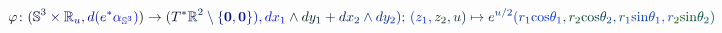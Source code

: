 \documentclass[12pt]{article}
\begin{document}
\makeatletter
\renewcommand*{\@textcolor}[3]{%
  \protect\leavevmode
  \begingroup
    \color#1{#2}#3%
  \endgroup
}
\makeatother
\begin{displaymath}
\mathcolor[RGB]{0,0,15}{\varphi} \mathcolor[RGB]{0,0,30}{\colon} \mathcolor[RGB]{0,0,45}{(} \mathbb { \mathcolor[RGB]{0,0,60}{S} } ^ { \mathcolor[RGB]{0,0,75}{3} } \mathcolor[RGB]{0,0,90}{\times} \mathbb { \mathcolor[RGB]{0,0,105}{R} } _ { \mathcolor[RGB]{0,0,120}{u} } \mathcolor[RGB]{0,0,135}{,} \mathcolor[RGB]{0,0,150}{d} \mathcolor[RGB]{0,0,165}{(} \mathcolor[RGB]{0,0,180}{e} ^ { \mathcolor[RGB]{0,0,195}{*} } \mathcolor[RGB]{0,0,210}{\alpha} _ { \mathbb { \mathcolor[RGB]{0,0,225}{S} } ^ { \mathcolor[RGB]{0,0,240}{3} } } \mathcolor[RGB]{0,0,255}{)} \mathcolor[RGB]{0,15,0}{)} \mathcolor[RGB]{0,15,15}{\to} \mathcolor[RGB]{0,15,30}{(} \mathcolor[RGB]{0,15,45}{T} ^ { \mathcolor[RGB]{0,15,60}{*} } \mathbb { \mathcolor[RGB]{0,15,75}{R} } ^ { \mathcolor[RGB]{0,15,90}{2} } \mathcolor[RGB]{0,15,105}{\setminus} \mathcolor[RGB]{0,15,120}{\{} \boldsymbol { \mathcolor[RGB]{0,15,135}{0} } \mathcolor[RGB]{0,15,150}{,} \boldsymbol { \mathcolor[RGB]{0,15,165}{0} } \mathcolor[RGB]{0,15,180}{\}} \mathcolor[RGB]{0,15,195}{)} \mathcolor[RGB]{0,15,210}{,} \mathcolor[RGB]{0,15,225}{d} \mathcolor[RGB]{0,15,240}{x} _ { \mathcolor[RGB]{0,15,255}{1} } \mathcolor[RGB]{0,30,0}{\wedge} \mathcolor[RGB]{0,30,15}{d} \mathcolor[RGB]{0,30,30}{y} _ { \mathcolor[RGB]{0,30,45}{1} } \mathcolor[RGB]{0,30,60}{+} \mathcolor[RGB]{0,30,75}{d} \mathcolor[RGB]{0,30,90}{x} _ { \mathcolor[RGB]{0,30,105}{2} } \mathcolor[RGB]{0,30,120}{\wedge} \mathcolor[RGB]{0,30,135}{d} \mathcolor[RGB]{0,30,150}{y} _ { \mathcolor[RGB]{0,30,165}{2} } \mathcolor[RGB]{0,30,180}{)} \mathcolor[RGB]{0,30,195}{;} \, \mathcolor[RGB]{0,30,210}{(} \mathcolor[RGB]{0,30,225}{z} _ { \mathcolor[RGB]{0,30,240}{1} } \mathcolor[RGB]{0,30,255}{,} \mathcolor[RGB]{0,45,0}{z} _ { \mathcolor[RGB]{0,45,15}{2} } \mathcolor[RGB]{0,45,30}{,} \mathcolor[RGB]{0,45,45}{u} \mathcolor[RGB]{0,45,60}{)} \mathcolor[RGB]{0,45,75}{\mapsto} \mathcolor[RGB]{0,45,90}{e} ^ { \mathcolor[RGB]{0,45,105}{u} \mathcolor[RGB]{0,45,120}{/} \mathcolor[RGB]{0,45,135}{2} } \mathcolor[RGB]{0,45,150}{(} \mathcolor[RGB]{0,45,165}{r} _ { \mathcolor[RGB]{0,45,180}{1} } \mathrm { \mathcolor[RGB]{0,45,195}{c} \mathcolor[RGB]{0,45,210}{o} \mathcolor[RGB]{0,45,225}{s} } \mathcolor[RGB]{0,45,240}{\theta} _ { \mathcolor[RGB]{0,45,255}{1} } \mathcolor[RGB]{0,60,0}{,} \mathcolor[RGB]{0,60,15}{r} _ { \mathcolor[RGB]{0,60,30}{2} } \mathrm { \mathcolor[RGB]{0,60,45}{c} \mathcolor[RGB]{0,60,60}{o} \mathcolor[RGB]{0,60,75}{s} } \mathcolor[RGB]{0,60,90}{\theta} _ { \mathcolor[RGB]{0,60,105}{2} } \mathcolor[RGB]{0,60,120}{,} \mathcolor[RGB]{0,60,135}{r} _ { \mathcolor[RGB]{0,60,150}{1} } \mathrm { \mathcolor[RGB]{0,60,165}{s} \mathcolor[RGB]{0,60,180}{i} \mathcolor[RGB]{0,60,195}{n} } \mathcolor[RGB]{0,60,210}{\theta} _ { \mathcolor[RGB]{0,60,225}{1} } \mathcolor[RGB]{0,60,240}{,} \mathcolor[RGB]{0,60,255}{r} _ { \mathcolor[RGB]{0,75,0}{2} } \mathrm { \mathcolor[RGB]{0,75,15}{s} \mathcolor[RGB]{0,75,30}{i} \mathcolor[RGB]{0,75,45}{n} } \mathcolor[RGB]{0,75,60}{\theta} _ { \mathcolor[RGB]{0,75,75}{2} } \mathcolor[RGB]{0,75,90}{)}
\end{displaymath}
\end{document}
